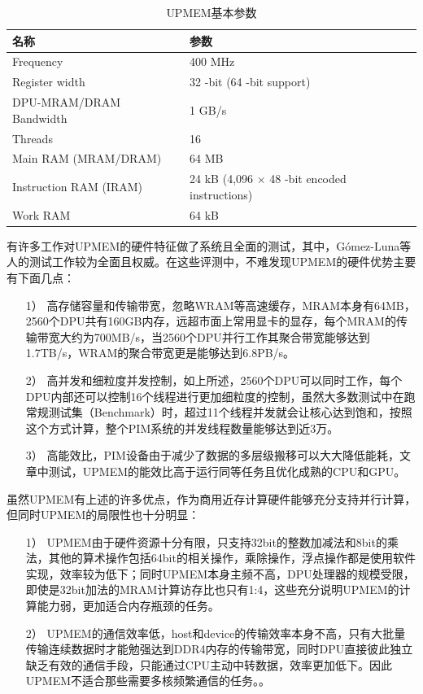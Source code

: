 \begin{table}[!htbp]
	\centering
	\label{UPMEMTable}
	\caption{UPMEM基本参数}
	\begin{tabular}{ll}
	  \toprule
	  名称 & 参数 \\
	  \midrule
	  Frequency & 400 MHz \\
	  Register width & 32 -bit (64 -bit support) \\
	  DPU-MRAM/DRAM Bandwidth & 1 GB/s \\
	  Threads & 16 \\
	  Main RAM (MRAM/DRAM) & 64 MB \\
	  Instruction RAM (IRAM) & 24 kB (4,096 $\times$ 48 -bit encoded instructions) \\
	  Work RAM & 64 kB \\
	  \bottomrule
	\end{tabular}
\end{table}

有许多工作对UPMEM的硬件特征做了系统且全面的测试\cite{BenchmarkingMutlu,BenchmarkingGermany,BenchmarkingUBC,BenchmarkingUPMEM,uPimulator}，其中，Gómez-Luna等人\cite{BenchmarkingMutlu}的测试工作较为全面且权威。在这些评测中，不难发现UPMEM的硬件优势主要有下面几点：
\begin{itemize}
	\item [1）] 
	高存储容量和传输带宽，忽略WRAM等高速缓存，MRAM本身有64MB，2560个DPU共有160GB内存，远超市面上常用显卡的显存，每个MRAM的传输带宽大约为700MB/s，当2560个DPU并行工作其聚合带宽能够达到1.7TB/s，WRAM的聚合带宽更是能够达到6.8PB/s。      
	\item [2）]
	高并发和细粒度并发控制，如上所述，2560个DPU可以同时工作，每个DPU内部还可以控制16个线程进行更加细粒度的控制，虽然大多数测试中在跑常规测试集（Benchmark）时，超过11个线程并发就会让核心达到饱和，按照这个方式计算，整个PIM系统的并发线程数量能够达到近3万。
	\item [3）]
	高能效比，PIM设备由于减少了数据的多层级搬移可以大大降低能耗，文章\cite{BenchmarkingMutlu}中测试，UPMEM的能效比高于运行同等任务且优化成熟的CPU和GPU。
\end{itemize}

虽然UPMEM有上述的许多优点，作为商用近存计算硬件能够充分支持并行计算，但同时UPMEM的局限性也十分明显：
\begin{itemize}
	\item [1）] 
	UPMEM由于硬件资源十分有限，只支持32bit的整数加减法和8bit的乘法，其他的算术操作包括64bit的相关操作，乘除操作，浮点操作都是使用软件实现，效率较为低下；同时UPMEM本身主频不高，DPU处理器的规模受限，即使是32bit加法的MRAM计算访存比也只有1:4\cite{BenchmarkingMutlu}，这些充分说明UPMEM的计算能力弱，更加适合内存瓶颈的任务。
	\item [2）]
	UPMEM的通信效率低，host和device的传输效率本身不高，只有大批量传输连续数据时才能勉强达到DDR4内存的传输带宽，同时DPU直接彼此独立缺乏有效的通信手段，只能通过CPU主动中转数据，效率更加低下。因此UPMEM不适合那些需要多核频繁通信的任务。\cite{BenchmarkingMutlu}。
\end{itemize}

